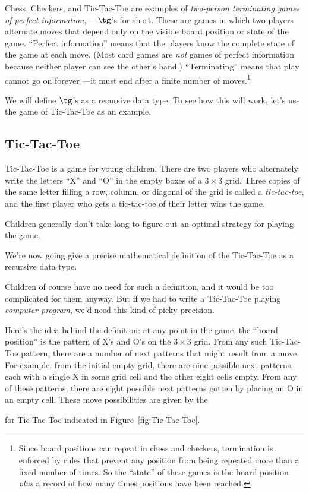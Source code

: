 \begin{definition}
Chess, Checkers, and Tic-Tac-Toe are examples of \emph{two-person
terminating games of perfect information}, ---$\tg$'s for short.  These
are games in which two players alternate moves that depend only on the
visible board position or state of the game.  ``Perfect information''
means that the players know the complete state of the game at each move.
(Most card games are \emph{not} games of perfect information because
neither player can see the other's hand.)  ``Terminating'' means that play
cannot go on forever ---it must end after a finite number of
moves.\footnote{Since board positions can repeat in chess and checkers,
termination is enforced by rules that prevent any position from being
repeated more than a fixed number of times.  So the ``state'' of these
games is the board position \emph{plus} a record of how many times
positions have been reached.}

We will define $\tg$'s \iffalse in a straightforward way tagged\fi as a 
recursive data type.  To see how this will work, let's use the game of
Tic-Tac-Toe as an example.

\subsection{Tic-Tac-Toe}

Tic-Tac-Toe is a game for young children.  There are two players who
alternately write the letters ``X'' and ``O'' in the empty boxes of a $3
\times 3$ grid.  Three copies of the same letter filling a row, column, or
diagonal of the grid is called a \emph{tic-tac-toe}, and the first player
who gets a tic-tac-toe of their letter wins the game.

\begin{staffnotes}
Children generally don't take long to figure out an optimal strategy
for playing the game.
\end{staffnotes}

We're now going give a precise mathematical definition of the Tic-Tac-Toe
 as a recursive data type.  \iffalse and carefully defining
the allowed moves\fi
\begin{staffnotes}
Children of course have no need for such a definition, and it would be
too complicated for them anyway.  But if we had to write a Tic-Tac-Toe
playing \emph{computer program}, we'd need this kind of picky
precision.
\end{staffnotes}

Here's the idea behind the definition: at any point in the game, the
``board position'' is the pattern of X's and O's on the $3 \times 3$
grid.  From any such Tic-Tac-Toe pattern, there are a number of next
patterns that might result from a move.  For example, from the initial
empty grid, there are nine possible next patterns, each with a single
X in some grid cell and the other eight cells empty.  From any of
these patterns, there are eight possible next patterns gotten by
placing an O in an empty cell.  These move possibilities are given by
the
 for Tic-Tac-Toe indicated in
Figure~\ref{fig:Tic-Tac-Toe}.


\end{definition}
